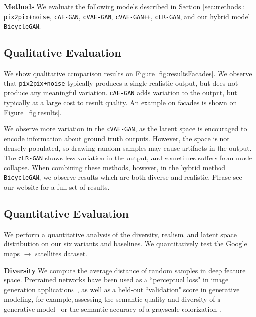 {\bf Methods} We evaluate the following models described in Section \ref{sec:methods}: \texttt{pix2pix+noise}, \texttt{cAE-GAN}, \texttt{cVAE-GAN}, \texttt{cVAE-GAN++}, \texttt{cLR-GAN}, and our hybrid model \texttt{BicycleGAN}.

\subsection{Qualitative Evaluation}

We show qualitative comparison results on Figure \ref{fig:resultsFacades}. We observe that \texttt{pix2pix+noise} typically produces a single realistic output, but does not produce any meaningful variation.
\texttt{cAE-GAN} adds variation to the output, but typically at a large cost to result quality. An example on facades is shown on Figure~\ref{fig:results}.

We observe more variation in the \texttt{cVAE-GAN}, as the latent space is encouraged to encode information about ground truth outputs. However, the space is not densely populated, so drawing random samples may cause artifacts in the output. The \texttt{cLR-GAN} shows less variation in the output, and sometimes suffers from mode collapse. When combining these methods, however, in the hybrid method \texttt{BicycleGAN}, we observe results which are both diverse and realistic. Please see our website for a full set of results.

\subsection{Quantitative Evaluation}

We perform a quantitative analysis of the diversity, realism, and latent space distribution on our six variants and baselines. We quantitatively test the Google maps $\rightarrow$ satellites dataset.

{\bf Diversity} We compute the average distance of random samples in deep feature space. Pretrained networks have been used as a ``perceptual loss" in image generation applications~\citep{gatys2016image,johnson2016perceptual,dosovitskiy2016generating}, as well as a held-out ``validation" score in generative modeling, for example, assessing the semantic quality and diversity of a generative model~\citep{salimans2016improved} or the semantic accuracy of a grayscale colorization~\citep{zhang2016colorful}.

